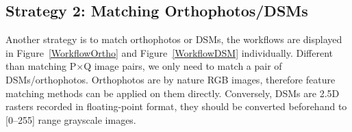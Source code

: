 
\subsection{Strategy 2: Matching Orthophotos/DSMs}
Another strategy is to match orthophotos or DSMs, the workflows are displayed in Figure~\ref{WorkflowOrtho} and Figure~\ref{WorkflowDSM} individually. Different than matching P$\times$Q image pairs, we only need to match a pair of DSMs/orthophotos.
Orthophotos are by nature RGB images, therefore feature matching methods can be applied on them directly. Conversely, DSMs are 2.5D rasters recorded in floating-point format, they should be converted beforehand to [0–255] range grayscale images.
\par

